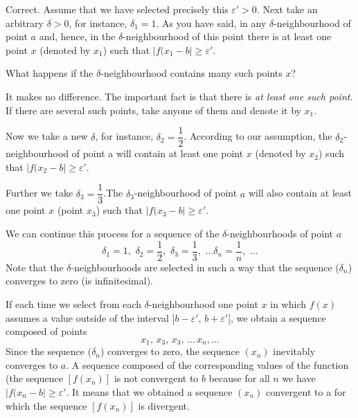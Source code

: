 {\athr Correct. Assume that we have selected precisely this $ \varepsilon' > 0$. Next take an arbitrary $\delta> 0$, for instance, $\delta_{1} = 1$. As you have said, in any $\delta$-neighbourhood of point $a$ and, hence, in the $\delta$-neighbourhood of this point there is at least one point $x$ (denoted by $x_{1}$) such that $|f(x_{1} -b|  \geqslant \varepsilon'$.

\rdr What happens if the $\delta$-neighbourhood contains many such points $x$? 

\athr It makes no difference. The important fact is that there is \emph{at least one such point}. If there are several such points, take anyone of them and denote it by $x_{1}$.

Now we take a new $\delta$, for instance, $\delta_{2} = \dfrac{1}{2}$. According
to our assumption, the $\delta_{2}$-neighbourhood of point a will contain at least one point $x$ (denoted by $x_{2}$) such that $|f(x_{2} -b | \geqslant \varepsilon'$.

Further we take $\delta_{3} = \dfrac{1}{3}$.The $\delta_{3}$-neighbourhood of point $a$ will also contain at least one point $x$ (point $x_{3}$) such that $|f(x_{3} -b|  \geqslant \varepsilon'$.

We can continue this process for a sequence of the $\delta$-neighbourhoods of point $a$
\begin{equation*}%
\delta_{1} = 1, \,\, \delta_{2} = \dfrac{1}{2}, \,\, \delta_{3} = \dfrac{1}{3}, \,\, \ldots \delta_{n} = \dfrac{1}{n}, \,\, \ldots
\end{equation*}
Note that the $\delta$-neighbourhoods are selected in such a way that the sequence ($\delta_{n}$) converges to zero (is infinitesimal).

If each time we select from each $\delta$-neighbourhood one point $x$ in which $f (x)$ assumes a value outside of the interval $]b- \varepsilon', \, b + \varepsilon'[$, we obtain a sequence composed of points
\begin{equation*}%
x_{1}, \, x_{3}, \, x_{3}, \, \ldots \, x_{n}, \ldots
\end{equation*}
 Since the sequence ($\delta_{n}$) converges to zero, the sequence $(x_{n})$ 
inevitably converges to $a$. A sequence composed of the corresponding	values	of the function	(the sequence	$[f (x_{n} ) ]$ is not convergent to $b$ because for all $n$ we have $|f(x_{n} -b | \geqslant \varepsilon'$. It means that we obtained a sequence $(x_{n} )$ convergent to a for which the sequence $[f (x_{n} ) ]$ is divergent.

}
